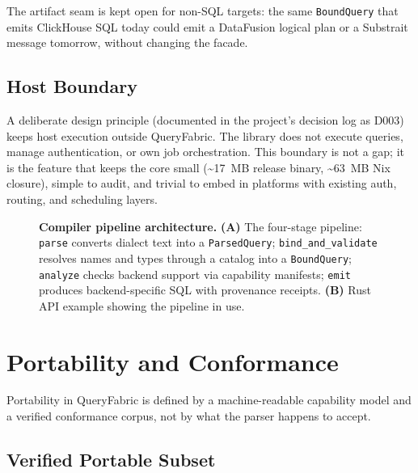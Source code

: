 \documentclass[11pt,a4paper]{article}
\begin{document}
The artifact seam is kept open for non-SQL targets: the same \texttt{BoundQuery}
that emits ClickHouse SQL today could emit a DataFusion logical plan or a
Substrait message tomorrow, without changing the facade.

\subsection{Host Boundary}
\label{sec:boundary}

A deliberate design principle (documented in the project's decision log as
D003) keeps host execution outside QueryFabric.
The library does not execute queries, manage authentication, or own job
orchestration.
This boundary is not a gap; it is the feature that keeps the core small
(\textasciitilde17~MB release binary, \textasciitilde63~MB Nix closure),
simple to audit, and trivial to embed in platforms with existing auth,
routing, and scheduling layers.

\begin{figure}[ht]
  \centering
  
  \caption{\textbf{Compiler pipeline architecture.}
    \textbf{(A)} The four-stage pipeline: \texttt{parse} converts dialect text
    into a \texttt{ParsedQuery}; \texttt{bind\_and\_validate} resolves names
    and types through a catalog into a \texttt{BoundQuery}; \texttt{analyze}
    checks backend support via capability manifests; \texttt{emit} produces
    backend-specific SQL with provenance receipts.
    \textbf{(B)} Rust API example showing the pipeline in use.}
  \label{fig:architecture}
\end{figure}

\section{Portability and Conformance}
\label{sec:portability}

Portability in QueryFabric is defined by a machine-readable capability model
and a verified conformance corpus, not by what the parser happens to accept.

\subsection{Verified Portable Subset}
\end{document}
